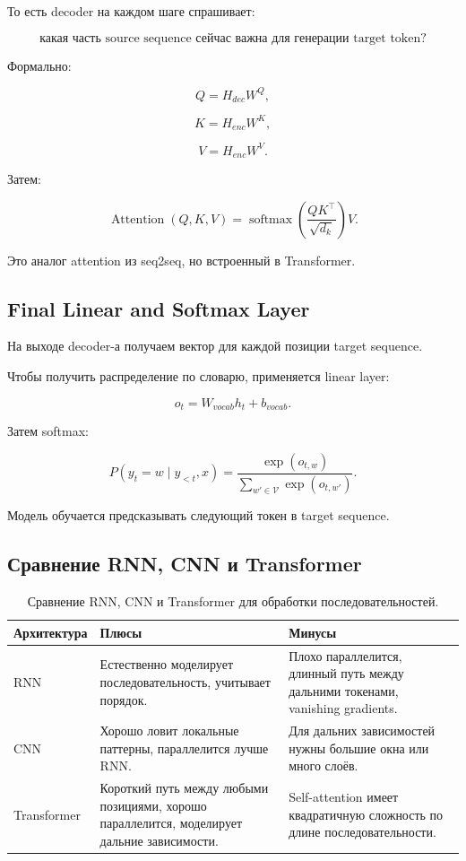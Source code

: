 \documentclass[a4paper,12pt]{article}
\begin{document}
То есть decoder на каждом шаге спрашивает:

\[
\text{какая часть source sequence сейчас важна для генерации target token?}
\]

Формально:

\[
Q = H_{dec}W^Q,
\]

\[
K = H_{enc}W^K,
\]

\[
V = H_{enc}W^V.
\]

Затем:

\[
\operatorname{Attention}(Q,K,V)
=
\operatorname{softmax}
\left(
\frac{QK^\top}{\sqrt{d_k}}
\right)V.
\]

Это аналог attention из seq2seq, но встроенный в Transformer.

\subsection{Final Linear and Softmax Layer}

На выходе decoder-а получаем вектор для каждой позиции target sequence.

Чтобы получить распределение по словарю, применяется linear layer:

\[
o_t = W_{vocab} h_t + b_{vocab}.
\]

Затем softmax:

\[
P(y_t = w \mid y_{<t}, x)
=
\frac{
\exp(o_{t,w})
}{
\sum_{w' \in \mathcal{V}}
\exp(o_{t,w'})
}.
\]

Модель обучается предсказывать следующий токен в target sequence.

\subsection{Сравнение RNN, CNN и Transformer}

\begin{table}[H]
\centering
\begin{tabular}{p{} p{} p{}}
\toprule
\textbf{Архитектура} & \textbf{Плюсы} & \textbf{Минусы} \\
\midrule

RNN &
Естественно моделирует последовательность, учитывает порядок. &
Плохо параллелится, длинный путь между дальними токенами, vanishing gradients. \\

CNN &
Хорошо ловит локальные паттерны, параллелится лучше RNN. &
Для дальних зависимостей нужны большие окна или много слоёв. \\

Transformer &
Короткий путь между любыми позициями, хорошо параллелится, моделирует дальние зависимости. &
Self-attention имеет квадратичную сложность по длине последовательности. \\

\bottomrule
\end{tabular}
\caption{Сравнение RNN, CNN и Transformer для обработки последовательностей.}
\end{table}
\end{document}
